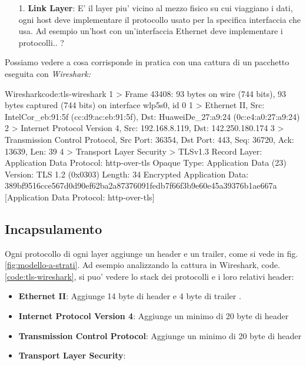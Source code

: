 \begin{enumerate}
    \item[1.] \textbf{Link Layer}: E' il layer piu' vicino al mezzo fisico su cui viaggiano i dati, ogni host deve implementare il protocollo usato per la specifica interfaccia che usa. Ad esempio un'host con un'interfaccia Ethernet deve implementare i protocolli.. ?
    

\end{enumerate}

Possiamo vedere a cosa corrisponde in pratica con una cattura di un pacchetto eseguita con \it{Wireshark}:

\begin{bashcode}{Wireshark}{code:tls-wireshark}
1 > Frame 43408: 93 bytes on wire (744 bits), 93 bytes captured (744 bits) on interface wlp5s0, id 0
1 > Ethernet II, Src: IntelCor_eb:91:5f (cc:d9:ac:eb:91:5f), Dst: HuaweiDe_27:a9:24 (0c:e4:a0:27:a9:24)
2 > Internet Protocol Version 4, Src: 192.168.8.119, Dst: 142.250.180.174
3 > Transmission Control Protocol, Src Port: 36354, Dst Port: 443, Seq: 36720, Ack: 13639, Len: 39
4 > Transport Layer Security
     > TLSv1.3 Record Layer: Application Data Protocol: http-over-tls
             Opaque Type: Application Data (23)
             Version: TLS 1.2 (0x0303)
             Length: 34
             Encrypted Application Data: 389bf9516cce567d0d90ef62ba2a87376091fedb7f66f3b9e60e45a39376b1ae667a
             [Application Data Protocol: http-over-tls]
\end{bashcode}

\subsection{Incapsulamento}

Ogni protocollo di ogni layer aggiunge un header e un trailer, come si vede in fig. \ref{fig:modello-a-strati}.
Ad esempio analizzando la cattura in Wireshark, code. \ref{code:tls-wireshark}, si puo' vedere lo stack dei protocolli e i loro relativi header:

\begin{itemize}
    \item \textbf{Ethernet II}: Aggiunge 14 byte di header e 4 byte di trailer \cite{ethernet-ii}.
    \item \textbf{Internet Protocol Version 4}: Aggiunge un minimo di 20 byte di header \cite{RFC_0791}
    \item \textbf{Transmission Control Protocol}: Aggiunge un minimo di 20 byte di header \cite{RFC_0793}
    \item \textbf{Transport Layer Security}: \cite{RFC_8446} %
\end{itemize}


